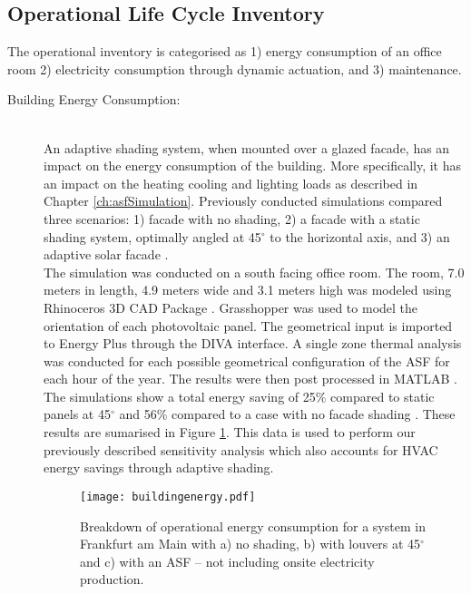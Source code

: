 \subsection{Operational Life Cycle Inventory}
\label{ch:Meth:Opp}

The operational inventory is categorised as 1) energy consumption of an office room 2) electricity consumption through dynamic actuation, and 3) maintenance.

\begin{description}


\item[Building Energy Consumption: ] \hfill\\
An adaptive shading system, when mounted over a glazed facade, has an impact on the energy consumption of the building. More specifically, it has an impact on the heating cooling and lighting loads as described in Chapter \ref{ch:asfSimulation}. Previously conducted simulations compared three scenarios: 1) facade with no shading, 2) a facade with a static shading system, optimally angled at 45$^{\circ}$ to the horizontal axis, and 3) an adaptive solar facade \cite{jayathissa2015abs}.\\

The simulation was conducted on a south facing office room. The room, 7.0 meters in length, 4.9 meters wide and 3.1 meters high was modeled using Rhinoceros 3D CAD Package \cite{Rhino}. Grasshopper \cite{grasshopper} was used to model the orientation of each photovoltaic panel. The geometrical input is imported to Energy Plus \cite{energyplus} through the DIVA \cite{DIVA} interface. A single zone thermal analysis was conducted for each possible geometrical configuration of the ASF for each hour of the year. The results were then post processed in MATLAB \cite{MATLAB}.\\

The simulations show a total energy saving of 25\% compared to static panels at 45$^\circ$ and 56\% compared to a case with no facade shading \cite{jayathissa2015abs}. These results are sumarised in Figure \ref{fig:operational}. This data is used to perform our previously described sensitivity analysis which also accounts for HVAC energy savings through adaptive shading. \\




\begin{figure}[H]
\begin{center}

\texttt{[image: buildingenergy.pdf]}
\caption{Breakdown of operational energy consumption for a system in Frankfurt am Main with a) no shading, b) with louvers at 45$^\circ$ and c) with an ASF  -- not including onsite electricity production.}
\label{fig:operational}


\end{center}
\end{figure}
\end{description}
